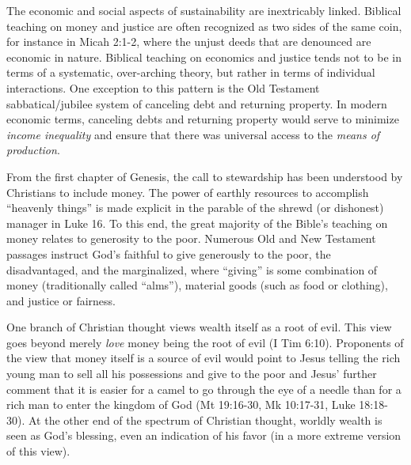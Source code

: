 \documentclass[12pt]{article}
\begin{document}

The economic and social aspects of sustainability are inextricably linked. Biblical teaching on money
and justice are often recognized as two sides of the same coin, for instance in Micah 2:1-2, where the unjust deeds that
are denounced are economic in nature. Biblical teaching on economics and justice tends not to be in terms of a
systematic, over-arching theory, but rather in terms of individual interactions.
One exception to this pattern is the Old Testament sabbatical/jubilee system of canceling debt and returning property. 
In modern economic terms, canceling debts and returning property would serve to minimize 
\emph{income inequality} and ensure that there was universal access to the \emph{means of production}.

From the first chapter of Genesis, the call to stewardship has
been understood by Christians to include money. The power of earthly resources to accomplish ``heavenly things'' is made
explicit in the parable of the shrewd (or dishonest) manager in Luke 16. To this end, the great majority of the Bible's
teaching on money relates to generosity to the poor. Numerous Old and New Testament passages instruct God's faithful to
give generously to the poor, the disadvantaged, and the marginalized, where ``giving'' is some combination of money
(traditionally called ``alms''), material goods (such as food or clothing), and justice or fairness.

One branch of Christian thought views wealth itself as a root of evil. This view goes beyond merely \emph{love} money
being the root of evil (I Tim 6:10). Proponents of the view that money itself is a source of evil would point to Jesus
telling the rich young man to sell all his possessions and give to the poor and Jesus' further comment that it is easier
for a camel to go through the eye of a needle than for a rich man to enter the kingdom of God (Mt 19:16-30, Mk 10:17-31,
Luke 18:18-30). At the other end of the spectrum of Christian thought, worldly wealth is seen as God's blessing, even an
indication of his favor (in a more extreme version of this view).
\end{document}
